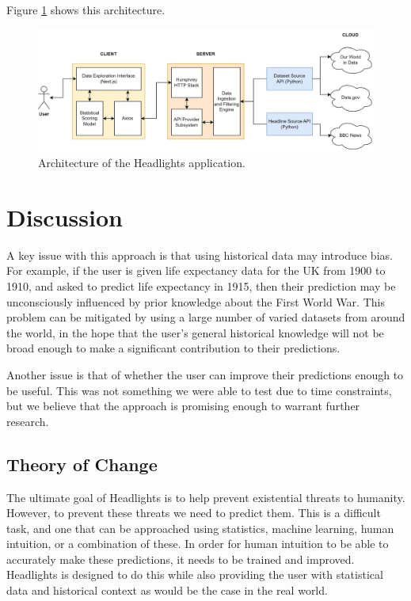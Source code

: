 \documentclass{article}
\begin{document}
Figure \ref{fig:architecture} shows this architecture.

\begin{figure}[h]
  \centering
  \includegraphics[width=\textwidth]{architecture.png}
  \caption{Architecture of the Headlights application.}
  \label{fig:architecture}
\end{figure}

\section{Discussion}

A key issue with this approach is that using historical data may introduce bias. For example, if the user is given life expectancy data for the UK from 1900 to 1910, and asked to predict life expectancy in 1915, then their prediction may be unconsciously influenced by prior knowledge about the First World War. This problem can be mitigated by using a large number of varied datasets from around the world, in the hope that the user's general historical knowledge will not be broad enough to make a significant contribution to their predictions.

Another issue is that of whether the user can improve their predictions enough to be useful. This was not something we were able to test due to time constraints, but we believe that the approach is promising enough to warrant further research.

\subsection{Theory of Change}

The ultimate goal of Headlights is to help prevent existential threats to humanity. However, to prevent these threats we need to predict them. This is a difficult task, and one that can be approached using statistics, machine learning, human intuition, or a combination of these. In order for human intuition to be able to accurately make these predictions, it needs to be trained and improved. Headlights is designed to do this while also providing the user with statistical data and historical context as would be the case in the real world.
\end{document}
